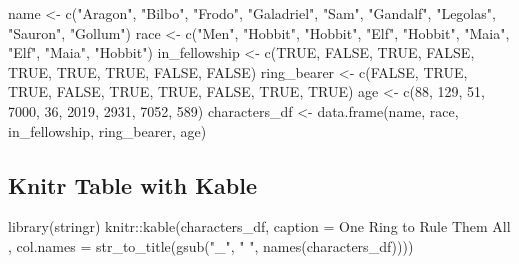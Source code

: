 \documentclass[
]{article}
\newenvironment{Shaded}{\begin{snugshade}}{\end{snugshade}}
\newcommand{\AttributeTok}[1]{\textcolor[rgb]{0.77,0.63,0.00}{#1}}
\newcommand{\ConstantTok}[1]{\textcolor[rgb]{0.00,0.00,0.00}{#1}}
\newcommand{\DecValTok}[1]{\textcolor[rgb]{0.00,0.00,0.81}{#1}}
\newcommand{\FunctionTok}[1]{\textcolor[rgb]{0.00,0.00,0.00}{#1}}
\newcommand{\NormalTok}[1]{#1}
\newcommand{\OtherTok}[1]{\textcolor[rgb]{0.56,0.35,0.01}{#1}}
\newcommand{\SpecialCharTok}[1]{\textcolor[rgb]{0.00,0.00,0.00}{#1}}
\newcommand{\StringTok}[1]{\textcolor[rgb]{0.31,0.60,0.02}{#1}}
\begin{document}
\begin{Shaded}
\begin{Highlighting}[]
\NormalTok{name }\OtherTok{\textless{}{-}} \FunctionTok{c}\NormalTok{(}\StringTok{"Aragon"}\NormalTok{, }\StringTok{"Bilbo"}\NormalTok{, }\StringTok{"Frodo"}\NormalTok{, }\StringTok{"Galadriel"}\NormalTok{, }\StringTok{"Sam"}\NormalTok{, }\StringTok{"Gandalf"}\NormalTok{, }\StringTok{"Legolas"}\NormalTok{, }\StringTok{"Sauron"}\NormalTok{, }\StringTok{"Gollum"}\NormalTok{)}
\NormalTok{race }\OtherTok{\textless{}{-}} \FunctionTok{c}\NormalTok{(}\StringTok{"Men"}\NormalTok{, }\StringTok{"Hobbit"}\NormalTok{, }\StringTok{"Hobbit"}\NormalTok{, }\StringTok{"Elf"}\NormalTok{, }\StringTok{"Hobbit"}\NormalTok{, }\StringTok{"Maia"}\NormalTok{, }\StringTok{"Elf"}\NormalTok{, }\StringTok{"Maia"}\NormalTok{, }\StringTok{"Hobbit"}\NormalTok{)}
\NormalTok{in\_fellowship }\OtherTok{\textless{}{-}} \FunctionTok{c}\NormalTok{(}\ConstantTok{TRUE}\NormalTok{, }\ConstantTok{FALSE}\NormalTok{, }\ConstantTok{TRUE}\NormalTok{, }\ConstantTok{FALSE}\NormalTok{, }\ConstantTok{TRUE}\NormalTok{, }\ConstantTok{TRUE}\NormalTok{, }\ConstantTok{TRUE}\NormalTok{, }\ConstantTok{FALSE}\NormalTok{, }\ConstantTok{FALSE}\NormalTok{)}
\NormalTok{ring\_bearer }\OtherTok{\textless{}{-}} \FunctionTok{c}\NormalTok{(}\ConstantTok{FALSE}\NormalTok{, }\ConstantTok{TRUE}\NormalTok{, }\ConstantTok{TRUE}\NormalTok{, }\ConstantTok{FALSE}\NormalTok{, }\ConstantTok{TRUE}\NormalTok{, }\ConstantTok{TRUE}\NormalTok{, }\ConstantTok{FALSE}\NormalTok{, }\ConstantTok{TRUE}\NormalTok{, }\ConstantTok{TRUE}\NormalTok{)}
\NormalTok{age }\OtherTok{\textless{}{-}} \FunctionTok{c}\NormalTok{(}\DecValTok{88}\NormalTok{, }\DecValTok{129}\NormalTok{, }\DecValTok{51}\NormalTok{, }\DecValTok{7000}\NormalTok{, }\DecValTok{36}\NormalTok{, }\DecValTok{2019}\NormalTok{, }\DecValTok{2931}\NormalTok{, }\DecValTok{7052}\NormalTok{, }\DecValTok{589}\NormalTok{)}
\NormalTok{characters\_df }\OtherTok{\textless{}{-}} \FunctionTok{data.frame}\NormalTok{(name, race, in\_fellowship, ring\_bearer, age)}
\end{Highlighting}
\end{Shaded}

\hypertarget{knitr-table-with-kable}{%
\subsection{Knitr Table with Kable}\label{knitr-table-with-kable}}

\begin{Shaded}
\begin{Highlighting}[]
\FunctionTok{library}\NormalTok{(stringr)}
\NormalTok{knitr}\SpecialCharTok{::}\FunctionTok{kable}\NormalTok{(characters\_df, }\AttributeTok{caption =} \StringTok{\textquotesingle{}One Ring to Rule Them All\textquotesingle{}}
\NormalTok{             , }\AttributeTok{col.names =} \FunctionTok{str\_to\_title}\NormalTok{(}\FunctionTok{gsub}\NormalTok{(}\StringTok{"\_"}\NormalTok{, }\StringTok{" "}\NormalTok{, }\FunctionTok{names}\NormalTok{(characters\_df))))}
\end{Highlighting}
\end{Shaded}
\end{document}
